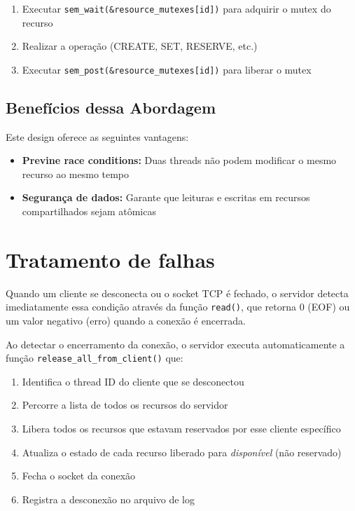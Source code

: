 \documentclass{article}
\begin{document}
\begin{enumerate}
    \item Executar \texttt{sem\_wait(\&resource\_mutexes[id])} para adquirir o mutex do recurso
    \item Realizar a operação (CREATE, SET, RESERVE, etc.)
    \item Executar \texttt{sem\_post(\&resource\_mutexes[id])} para liberar o mutex
\end{enumerate}

\subsection{Benefícios dessa Abordagem}

Este design oferece as seguintes vantagens:

\begin{itemize}
    \item \textbf{Previne race conditions:} Duas threads não podem modificar o mesmo recurso ao mesmo tempo
    \item \textbf{Segurança de dados:} Garante que leituras e escritas em recursos compartilhados sejam atômicas
\end{itemize}

\section{Tratamento de falhas}

Quando um cliente se desconecta ou o socket TCP é fechado, o servidor detecta imediatamente essa condição através da função \texttt{read()}, que retorna 0 (EOF) ou um valor negativo (erro) quando a conexão é encerrada.

Ao detectar o encerramento da conexão, o servidor executa automaticamente a função \texttt{release\_all\_from\_client()} que:

\begin{enumerate}
    \item Identifica o thread ID do cliente que se desconectou
    \item Percorre a lista de todos os recursos do servidor
    \item Libera todos os recursos que estavam reservados por esse cliente específico
    \item Atualiza o estado de cada recurso liberado para \textit{disponível} (não reservado)
    \item Fecha o socket da conexão
    \item Registra a desconexão no arquivo de log
\end{enumerate}
\end{document}
